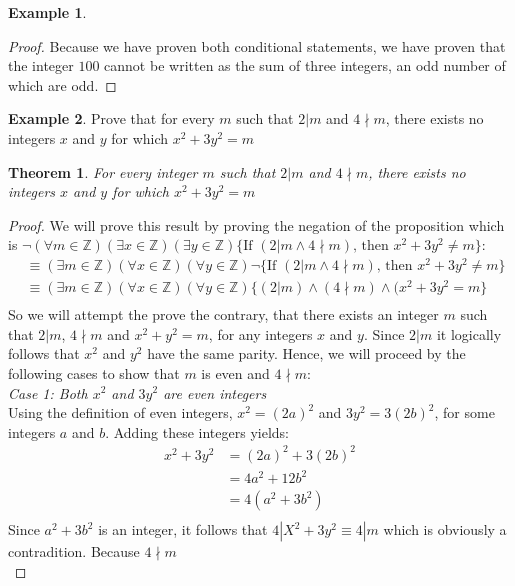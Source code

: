 \documentclass{book}
\newtheorem{theorem}{Theorem}[section]
\theoremstyle{definition}
\newtheorem{example}{Example}[definition]
\theoremstyle{remark}
\newcommand{\bb}[1]{\mathbb{#1}}
\begin{document}
\begin{example}
\begin{proof}
    Because we have proven both conditional statements, we have proven that the integer $100$ cannot be written as the sum of three integers, an odd number of which are odd. 
\end{proof}
\end{example}

\newpage
\begin{example}
Prove that for every $m$ such that $2 | m$ and $4 \nmid m$, there exists no integers $x$ and $y$ for which $x^2 + 3y^2 = m$
\begin{tcolorbox}
    \begin{theorem}
        For every integer $m$ such that $2 | m$ and $4 \nmid m$, there exists no integers $x$ and $y$ for which $x^2 + 3y^2 = m$
    \end{theorem}
\end{tcolorbox}

\begin{proof}
    We will prove this result by proving the negation of the proposition which is $\neg (\forall m \in \bb{Z})(\exists x \in \bb{Z})(\exists y \in \bb{Z}) \{ \text{If } (2 | m \wedge 4 \nmid m) \text{, then }x^2 + 3y^2 \neq m\}$:
        \begin{align*}
            & \equiv (\exists m \in \bb{Z})(\forall x \in \bb{Z})(\forall y \in \bb{Z}) \neg \{ \text{If } (2 | m \wedge 4 \nmid m) \text{, then }x^2 + 3y^2 \neq m\} \\
            & \equiv (\exists m \in \bb{Z})(\forall x \in \bb{Z})(\forall y \in \bb{Z}) \{ (2 | m) \wedge (4 \nmid m) \wedge (x^2 + 3y^2 = m\} \\ 
        \end{align*}
    So we will attempt the prove the contrary, that there exists an integer $m$ such that $2 | m$, $4 \nmid m$ and $x^2 + y^2 = m$, for any integers $x$ and $y$. Since $2 | m$ it logically follows that $x^2$ and  $y^2$ have the same parity. Hence, we will proceed by the following cases to show that $m$ is even and $4 \nmid m$: \\
   
    \textit{Case 1: Both $x^2$ and $3y^2$ are even integers} \\
        Using the definition of even integers, $x^2 = (2a)^2$ and $3y^2 = 3(2b)^2$, for some integers $a$ and $b$. Adding these integers yields:
            \begin{align*}
                x^2 + 3y^2 & = (2a)^2 + 3(2b)^2 \\
                    & = 4a^2 + 12b^2 \\
                    & = 4(a^2 + 3b^2) \\
            \end{align*}
        Since $a^2 + 3b^2$ is an integer, it follows that $4 | X^2 + 3y^2 \equiv 4 | m$ which is obviously a contradition. Because $4 \nmid m$ \\
    

\end{proof}
\end{example}
\end{document}
